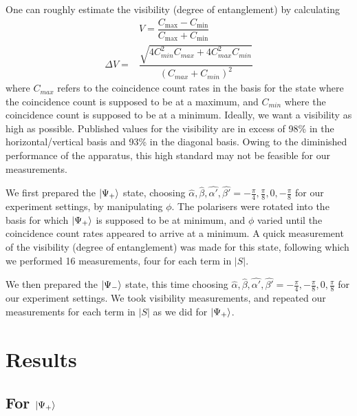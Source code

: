 \documentclass[aps,prl,nofootinbib,twocolumn,superscriptaddress,groupedaddress]{revtex4}  %
\begin{document}
One can roughly estimate the visibility (degree of entanglement) by calculating
\begin{align}
&V = \dfrac{C_{\mathrm{max}} - C_{\mathrm{min}}}{C_{\mathrm{max}} + C_{\mathrm{min}}}\\
\Delta V = &\dfrac{\sqrt{4C^{2}_{min}C_{max} + 4C^{2}_{max}C_{min}}}{(C_{max} + C_{min})^{2}}
\end{align} where $C_{max}$ refers to the coincidence count rates in the basis for the state where the coincidence count is supposed to be at a maximum, and $C_{min}$ where the coincidence count is supposed to be at a minimum. Ideally, we want a visibility as high as possible. Published values for the visibility are in excess of 98\% in the horizontal/vertical basis and 93\% in the diagonal basis. Owing to the diminished performance of the apparatus, this high standard may not be feasible for our measurements.

We first prepared the $\ket{\Psi_{+}}$ state, choosing $\hat{\alpha},\hat{\beta},\hat{\alpha'},\hat{\beta'} = -\frac{\pi}{4},\frac{\pi}{8},0,-\frac{\pi}{8}$ for our experiment settings, by manipulating $\phi$. The polarisers were rotated into the basis for which $\ket{\Psi_{+}}$ is supposed to be at minimum, and $\phi$ varied until the coincidence count rates appeared to arrive at a minimum. A quick measurement of the visibility (degree of entanglement) was made for this state, following which we performed 16 measurements, four for each term in $|S|$. 

We then prepared the $\ket{\Psi_{-}}$ state, this time choosing $\hat{\alpha},\hat{\beta},\hat{\alpha'},\hat{\beta'} = -\frac{\pi}{4},-\frac{\pi}{8},0,\frac{\pi}{8}$ for our experiment settings. We took visibility measurements, and repeated our measurements for each term in $|S|$ as we did for $\ket{\Psi_{+}}$.

\section{Results}

\subsection*{For $\ket{\Psi_{+}}$}
\end{document}
